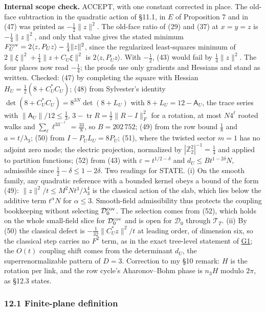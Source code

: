 \documentclass[11pt,a4paper]{article}
\begin{document}
\textbf{Internal scope check.} ACCEPT, with one constant corrected in
place. The old-face subtraction in the quadratic action of §11.1, in
\(E\) of Proposition 7 and in (47) was printed as \(-\frac12\|z\|^2\).
The old-face ratio of (29) and (37) at \(x=y=z\) is \(-\frac14\|z\|^2\),
and only that value gives the stated minimum
\(F_U^{\rm cov}=2\langle z,P_Uz\rangle-\frac14\|z\|^2\), since the
regularized least-squares minimum of
\(2\|\xi\|^2+\frac14\|z+C_U\xi\|^2\) is \(2\langle z,P_Uz\rangle\). With
\(-\frac12\), (43) would fail by \(\frac14\|z\|^2\). The four places now
read \(-\frac14\); the proofs use only gradients and Hessians and stand
as written. Checked: (47) by completing the square with Hessian
\(H_U=\frac12(8+C_U^*C_U)\); (48) from Sylvester's identity
\(\det(8+C_U^*C_U)=8^{3N}\det(8+L_U)\) with \(8+L_U=12-\mathsf A_U\),
the trace series with \(\|\mathsf A_U\|/12\le\frac13\),
\(3-\operatorname{tr}R=\frac12\|R-I\|_F^2\) for a rotation, at most
\(N4^\ell\) rooted walks and \(\sum_\ell\ell^33^{-\ell}=\frac{33}8\), so
\(B=202\,752\); (49) from the row bound \(\frac18\) and
\(a=t/\lambda_3\); (50) from \(I-P_UL_U=8P_U\); (51), where the twisted
sector \(m=1\) has no adjoint zero mode; the electric projection,
normalized by \(|\mathbb Z_2^2|^{-1}=\frac14\) and applied to partition
functions; (52) from (43) with \(\varepsilon=t^{1/2-\delta}\) and
\(d_U\le Bt^{1-2\delta}N\), admissible since
\(\frac12-\delta\le1-2\delta\). Two readings for STATE. (i) On the
smooth family, any quadratic reference with a bounded kernel obeys a
bound of the form (49): \(\|z\|^2/t\le M^2Nt^3/\lambda_3^4\) is the
classical action of the slab, which lies below the additive term
\(t^\alpha N\) for \(\alpha\le3\). Smooth-field admissibility thus
protects the coupling bookkeeping without selecting
\(\mathcal D_0^{\rm cov}\). The selection comes from (52), which holds
on the whole small-field slice for \(\mathcal D_0^{\rm cov}\) and is
open for \(\mathcal D_0\) through \(\mathcal T_T\). (ii) By (50) the
classical defect is \(-\frac1{32}\|C_U^*z\|^2/t\) at leading order, of
dimension six, so the classical step carries no \(F^2\) term, as in the
exact tree-level statement of \href{gaussian-blocking-coupling.md}{G1};
the \(O(t)\) coupling shift comes from the determinant \(d_U\), the
superrenormalizable pattern of \(D=3\). Correction to my §10 remark:
\(H\) is the rotation per link, and the row cycle's Aharonov--Bohm phase
is \(n_3H\) modulo \(2\pi\), as §12.3 states.

\hypertarget{finite-plane-definition}{%
\subsubsection{12.1 Finite-plane
definition}\label{finite-plane-definition}}
\end{document}

